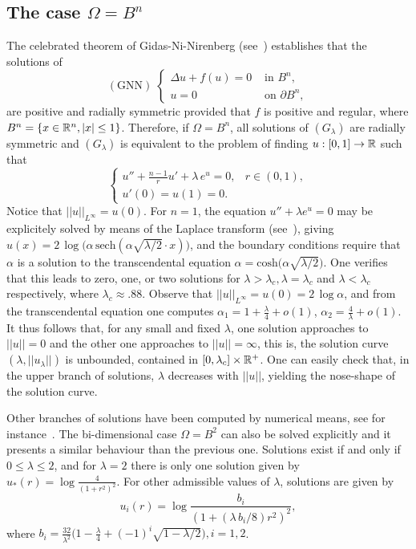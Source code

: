 
\subsection{The case $\Omega=B^n$}\label{sec:ball}
The celebrated theorem of Gidas-Ni-Nirenberg (see~\cite{gidas-ni-nirenberg})
establishes that the solutions of
\begin{equation}
    (\mbox{GNN})\;\left\{
        \begin{array}{cc} \Delta u + f(u)=0 & \mbox{ in }B^n,\\
        u=0 & \mbox{ on }\partial B^n,
    \end{array}\right.
\end{equation}
are positive and radially symmetric provided that $f$ is positive and regular,
where $B^n=\{x\in\mathbb{R}^n,|x|\leq 1\}$. Therefore, if $\Omega=B^n$, all solutions
of $(G_\lambda)$ are radially symmetric and $(G_\lambda)$ is equivalent to the
problem of finding $u:[0,1]\to\mathbb{R}$ such that
\begin{equation}
    \left\{\begin{array}{lc}
            u''+\frac{n-1}{r}u'+\lambda\, e^u =0, & r\in (0,1),\\
    u'(0) = u(1) = 0.&  \end{array}\right.
\end{equation}
Notice that $||u||_{L^\infty}=u(0)$. For $n=1$, the equation $u''+\lambda e^u=0$
may be explicitely solved by means of the Laplace transform (see~\cite{bratu}),
giving $u(x)=2\,\log\big(\alpha\,\mbox{sech}(\alpha\sqrt{\lambda/2}\cdot
x)\big)$, and the boundary conditions require that $\alpha$ is a solution to
the transcendental equation $\alpha
=\mbox{cosh}\big(\alpha\sqrt{\lambda/2}\big)$. One verifies that this leads to
zero, one, or two solutions for $\lambda>\lambda_c,\lambda=\lambda_c$ and
$\lambda<\lambda_c$ respectively, where $\lambda_c\approx.88$. Observe that
$||u||_{L^\infty}=u(0)=2\,\log\alpha$, and from the transcendental equation one
computes $\alpha_1=1+\frac{\lambda}{4}+o(1)$, $\alpha_2=\frac{4}{\lambda}+o(1)$.
It thus follows that, for any small and fixed $\lambda$, one solution
approaches to $||u||=0$ and the other one approaches to $||u||=\infty$, this is,
the solution curve $(\lambda, ||u_\lambda||)$ is unbounded, contained in
$[0,\lambda_c]\times \mathbb{R}^+$. One can easily check that, in the upper branch of
solutions, $\lambda$ decreases with $||u||$, yielding the nose-shape of the
solution curve.

Other branches of solutions have been computed by numerical means, see for
instance~\cite{new-solutions}.  The bi-dimensional case $\Omega=B^2$ can also
be solved explicitly and it presents a similar behaviour than the previous one.
Solutions exist if and only if $0\leq \lambda \leq 2$, and for $\lambda=2$
there is only one solution given by $u_\ast(r)=\log\frac{4}{{(1+r^2)}^2}$.
For other admissible values of $\lambda$, solutions are given by
\[
    u_i(r)=\log\frac{b_i}{{(1+(\lambda\, b_i/8)r^2)}^2},
\]
where
$b_i=\frac{32}{\lambda^2}\big(1-\frac{\lambda}{4}+{(-1)}^i\sqrt{1-\lambda/2}\big),
i=1,2$.
\medskip

